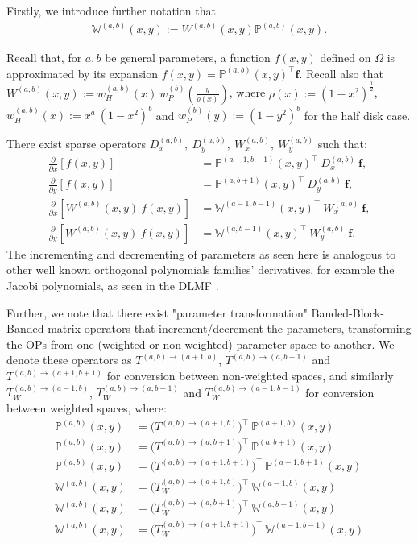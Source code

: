 \documentclass[11pt, oneside]{article}   	%
\newcommand{\half}{\frac{1}{2}}
\newcommand{\bigP}{\mathbb{P}}
\newcommand{\Wab}{{W^{(a,b)}}}
\newcommand{\bigPab}{\bigP^{(a,b)}}
\newcommand{\dx}{\frac{\partial}{\partial x}}
\newcommand{\dy}{\frac{\partial}{\partial y}}
\newcommand{\bigW}{\mathbb{W}}
\newcommand{\bigWab}{\mathbb{W}^{(a,b)}}
\begin{document}
Firstly, we introduce further notation that
\begin{align}
\bigWab(x,y) := \Wab(x,y) \bigPab(x,y).
\end{align}

Recall that, for $a, b$ be general parameters, a function $f(x,y)$ defined on $\Omega$ is approximated by its expansion $f(x,y) = \bigPab(x,y)^\top \mathbf{f}$. Recall also that $\Wab(x,y) := w_H^{(a,b)}(x) \: w_P^{(b)}(\frac{y}{\rho(x)})$, where $\rho(x) := (1-x^2)^\half$, $w_H^{(a,b)}(x) := x^a \: (1-x^2)^b$ and $w_P^{(b)}(y) := (1-y^2)^b$ for the half disk case.

There exist sparse operators \(D_x^{(a,b)}, \: D_y^{(a,b)}, \: W_x^{(a,b)}, \: W_y^{(a,b)}\) such that:
\begin{align}
\dx[f(x,y)] &= \bigP^{(a+1,b+1)}(x,y)^\top \: D_x^{(a,b)} \: \mathbf{f}, \\
\dy[f(x,y)] &= \bigP^{(a,b+1)}(x,y)^\top \: D_y^{(a,b)} \: \mathbf{f}, \\
\dx[\Wab(x,y) \: f(x,y)] &= \bigW^{(a-1,b-1)}(x,y)^\top \: W_x^{(a,b)} \: \mathbf{f}, \\
\dy[\Wab(x,y) \: f(x,y)] &= \bigW^{(a,b-1)}(x,y)^\top \: W_y^{(a,b)} \: \mathbf{f}.
\end{align}
The incrementing and decrementing of parameters as seen here is analogous to other well known orthogonal polynomials families' derivatives, for example the Jacobi polynomials, as seen in the DLMF \cite{DLMFDerivatives}.

Further, we note that there exist "parameter transformation" Banded-Block-Banded matrix operators that increment/decrement the parameters, transforming the OPs from one (weighted or non-weighted) parameter space to another. We denote these operators as $T^{(a,b)\to(a+1,b)}$, $T^{(a,b)\to(a,b+1)}$ and $T^{(a,b)\to(a+1,b+1)}$ for conversion between non-weighted spaces, and similarly $T_W^{(a,b)\to(a-1,b)}$, $T_W^{(a,b)\to(a,b-1)}$ and $T_W^{(a,b)\to(a-1,b-1)}$ for conversion between weighted spaces, where:
\begin{align}
\bigP^{(a,b)}(x,y) &= \Big(T^{(a,b)\to(a+1,b)} \Big)^\top \: \bigP^{(a+1,b)}(x,y) \\
\bigP^{(a,b)}(x,y) &= \Big(T^{(a,b)\to(a,b+1)} \Big)^\top \: \bigP^{(a,b+1)}(x,y) \\
\bigP^{(a,b)}(x,y) &= \Big(T^{(a,b)\to(a+1,b+1)} \Big)^\top \: \bigP^{(a+1,b+1)}(x,y) \\
\bigW^{(a,b)}(x,y) &= \Big(T_W^{(a,b)\to(a+1,b)} \Big)^\top \: \bigW^{(a-1,b)}(x,y) \\
\bigW^{(a,b)}(x,y) &= \Big(T_W^{(a,b)\to(a,b+1)} \Big)^\top \: \bigW^{(a,b-1)}(x,y) \\
\bigW^{(a,b)}(x,y) &= \Big(T_W^{(a,b)\to(a+1,b+1)} \Big)^\top \: \bigW^{(a-1,b-1)}(x,y) \\
\end{align}
\end{document}
